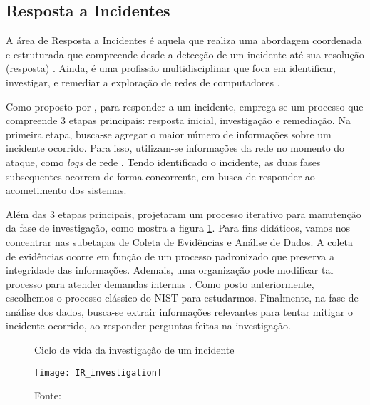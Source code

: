     \subsection{Resposta a Incidentes} \label{cap1_ir}
    
    \hspace{1cm}
    A área de Resposta a Incidentes é aquela que realiza uma abordagem coordenada e estruturada que compreende desde a detecção de um incidente até sua resolução (resposta) \cite{luttgens2014}. Ainda, é uma profissão multidisciplinar que foca em identificar, investigar, e remediar a exploração de redes de computadores \cite{roberts2016}.

    \vspace{4mm}

    \hspace{1cm}
    Como proposto por , para responder a um incidente, emprega-se um processo que compreende 3 etapas principais: resposta inicial, investigação e remediação. Na primeira etapa, busca-se agregar o maior número de informações sobre um incidente ocorrido. Para isso, utilizam-se informações da rede no momento do ataque, como \textit{logs} de rede \cite{luttgens2014}. Tendo identificado o incidente, as duas fases subsequentes ocorrem de forma concorrente, em busca de responder ao acometimento dos sistemas.
        
    \vspace{4mm}
    
    \hspace{1cm}
    Além das 3 etapas principais,  projetaram um processo iterativo para manutenção da fase de investigação, como mostra a figura \ref{IR_lifecycle}. Para fins didáticos, vamos nos concentrar nas subetapas de Coleta de Evidências e Análise de Dados. A coleta de evidências ocorre em função de um processo padronizado que preserva a integridade das informações. Ademais, uma organização pode modificar tal processo para atender demandas internas \cite{luttgens2014}. Como posto anteriormente, escolhemos o processo clássico do NIST para estudarmos. Finalmente, na fase de análise dos dados, busca-se extrair informações relevantes para tentar mitigar o incidente ocorrido, ao responder perguntas feitas na investigação.
    
    \begin{figure}[H]
    	\centering
    	\caption{Ciclo de vida da investigação de um incidente}
    	\texttt{[image: IR\_investigation]}
    	\caption*{Fonte: }
    	\label{IR_lifecycle}
    \end{figure}
    
